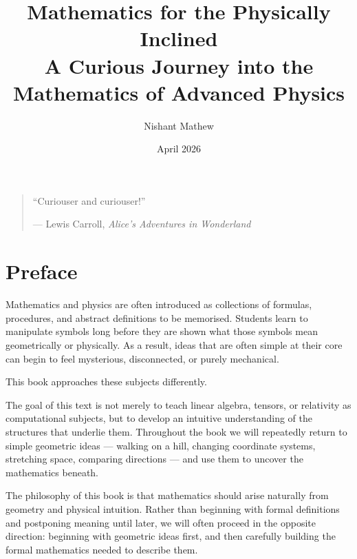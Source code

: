 \documentclass[11pt,openany]{book}
\title{\Huge Mathematics for the Physically Inclined\\[0.5em]
\Large A Curious Journey into the Mathematics of Advanced Physics}
\author{Nishant Mathew}
\date{April 2026}
\theoremstyle{definition}
\begin{document}
\frontmatter

\maketitle


\vspace*{0.3\textheight}

\begin{quote}
\centering
``Curiouser and curiouser!''

\medskip

--- Lewis Carroll, \textit{Alice's Adventures in Wonderland}
\end{quote}

\vspace{1cm}





\chapter*{Preface}

Mathematics and physics are often introduced as collections of formulas, procedures,
and abstract definitions to be memorised. Students learn to manipulate symbols long
before they are shown what those symbols mean geometrically or physically. As a result,
ideas that are often simple at their core can begin to feel mysterious, disconnected,
or purely mechanical.

\medskip

This book approaches these subjects differently.


\medskip

The goal of this text is not merely to teach linear algebra, tensors, or relativity as
computational subjects, but to develop an intuitive understanding of the structures that
underlie them. Throughout the book we will repeatedly return to simple geometric ideas
--- walking on a hill, changing coordinate systems, stretching space, comparing directions
--- and use them to uncover the mathematics beneath.

\medskip

The philosophy of this book is that mathematics should arise naturally from geometry and
physical intuition. Rather than beginning with formal definitions and postponing meaning
until later, we will often proceed in the opposite direction: beginning with geometric
ideas first, and then carefully building the formal mathematics needed to describe them.
\end{document}
